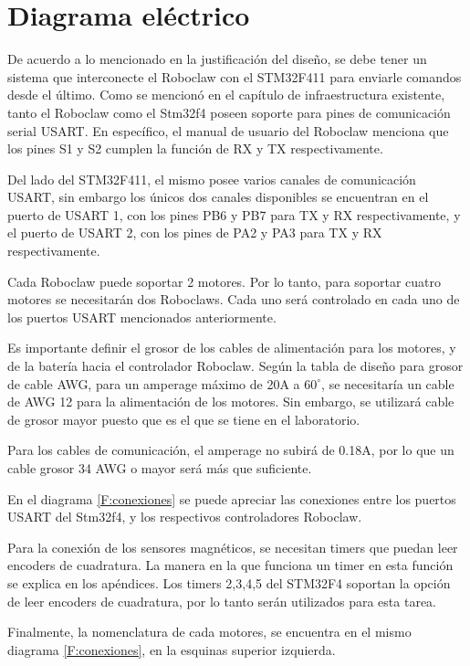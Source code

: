 \section{Diagrama eléctrico}

De acuerdo a lo mencionado en la justificación del diseño, se debe tener un sistema que interconecte el Roboclaw con el STM32F411 para enviarle comandos desde el último. Como se mencionó en el capítulo de infraestructura existente, tanto el Roboclaw como el Stm32f4 poseen soporte para pines de comunicación serial USART. En específico, el manual de usuario del Roboclaw menciona que los pines S1 y S2 cumplen la función de RX y TX respectivamente.

Del lado del STM32F411, el mismo posee varios canales de comunicación USART, sin embargo los únicos dos canales disponibles se encuentran en el puerto de USART 1, con los pines PB6 y PB7 para TX y RX respectivamente, y el puerto de USART 2, con los pines de PA2 y PA3 para TX y RX respectivamente.

Cada Roboclaw puede soportar 2 motores. Por lo tanto, para soportar cuatro motores se necesitarán dos Roboclaws. Cada uno será controlado en cada uno de los puertos USART mencionados anteriormente.

Es importante definir el grosor de los cables de alimentación para los motores, y de la batería hacia el controlador Roboclaw. Según la tabla de diseño para grosor de cable AWG, para un amperage máximo de 20A a $60^\circ$, se necesitaría un cable de AWG 12 para la alimentación de los motores. Sin embargo, se utilizará cable de grosor mayor puesto que es el que se tiene en el laboratorio.

Para los cables de comunicación, el amperage no subirá de 0.18A, por lo que un cable grosor 34 AWG o mayor será más que suficiente.

En el diagrama \ref{F:conexiones} se puede apreciar las conexiones entre los puertos USART del Stm32f4, y los respectivos controladores Roboclaw.

Para la conexión de los sensores magnéticos, se necesitan timers que puedan leer encoders de cuadratura. La manera en la que funciona un timer en esta función se explica en los apéndices. Los timers 2,3,4,5 del STM32F4 soportan la opción de leer encoders de cuadratura, por lo tanto serán utilizados para esta tarea.

Finalmente, la nomenclatura de cada motores, se encuentra en el mismo diagrama \ref{F:conexiones}, en la esquinas superior izquierda.

